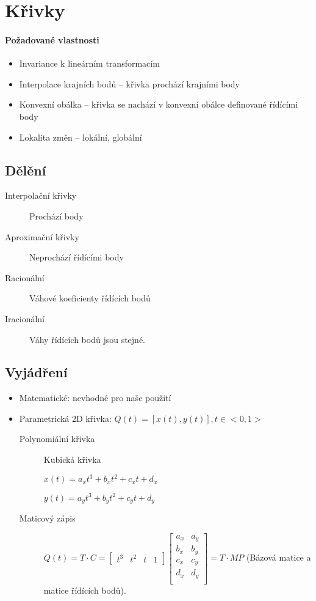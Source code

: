 \documentclass[a4paper, 11pt]{report}
\begin{document}
\section{Křivky}

\paragraph{Požadované vlastnosti}
\begin{itemize}
	\item Invariance k lineárním transformacím
	\item Interpolace krajních bodů -- křivka prochází krajními body
	\item Konvexní obálka -- křivka se nachází v konvexní obálce definované řídícími body
	\item Lokalita změn -- lokální, globální
\end{itemize}

\subsection{Dělění}
\begin{description}
	\item[Interpolační křivky] Prochází body
	\item[Aproximační křivky] Neprochází řídícími body
\end{description}

\begin{description}
	\item[Racionální] Váhové koeficienty řídících bodů
	\item[Iracionální] Váhy řídících bodů jsou stejné.
\end{description}

\subsection{Vyjádření}
\begin{itemize}
	\item Matematické: nevhodné pro naše použití
	\item Parametrická 2D křivka: $Q(t) = [x(t), y(t)], t \in <0,1>$
	
	\begin{description}
		\item[Polynomiální křivka] Kubická křivka
		
		$x(t) = a_x t^3 + b_x t^2 + c_x t + d_x$
		
		$y(t) = a_y t^3 + b_y t^2 + c_y t + d_y$
		
		\item[Maticový zápis] $Q(t) = T \cdot C =
\begin{bmatrix}
t^3 & t^2 & t & 1
\end{bmatrix}
\begin{bmatrix}
a_x & a_y\\
b_x & b_y\\
c_x & c_y\\
d_x & d_y\\
\end{bmatrix} = T \cdot M P$ (Bázová matice a matice řídících bodů).
	\end{description}
\end{itemize}
\end{document}
